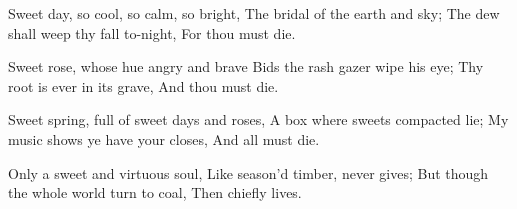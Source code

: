 \startlanguage[en]
\startlines 
Sweet day, so cool, so calm, so bright,
The bridal of the earth and sky;
The dew shall weep thy fall to-night,
For thou must die.

Sweet rose, whose hue angry and brave
Bids the rash gazer wipe his eye;
Thy root is ever in its grave,
And thou must die.

Sweet spring, full of sweet days and roses,
A box where sweets compacted lie;
My music shows ye have your closes,
And all must die.

Only a sweet and virtuous soul,
Like season'd timber, never gives;
But though the whole world turn to coal,
Then chiefly lives. 
\stoplines 
\stoplanguage